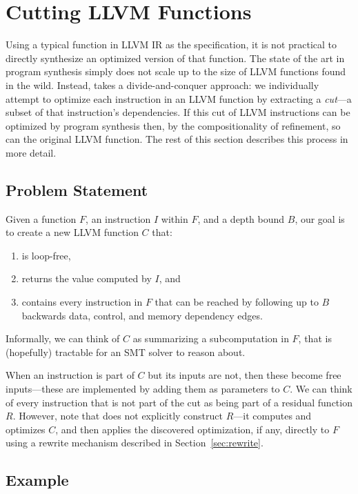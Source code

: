 \section{Cutting LLVM Functions}
\label{sec:cut}

Using a typical function in LLVM IR as the specification, it is not
practical to directly synthesize an optimized version of that
function.
%
The state of the art in program synthesis simply does not scale up to
the size of LLVM functions found in the wild.
%
Instead, \minotaur{} takes a divide-and-conquer approach: we individually
attempt to optimize each instruction in an LLVM function by extracting
a \textit{cut}---a subset of that instruction's dependencies.
%
If this cut of LLVM instructions can be optimized by program synthesis
then, by the compositionality of refinement, so can the original LLVM
function.
%
The rest of this section describes this process in more detail.


\subsection{Problem Statement}

Given a function $F$, an instruction $I$ within $F$, and a depth
bound $B$, our goal is to create a new LLVM function $C$ that:
%
\begin{enumerate}
\item
  is loop-free,
\item
  returns the value computed by $I$, and
\item
  contains every instruction in $F$ that can be reached by following
  up to $B$ backwards data, control, and memory dependency edges.
\end{enumerate}
%
Informally, we can think of $C$ as summarizing a subcomputation in
$F$, that is (hopefully) tractable for an SMT solver to reason about.


When an instruction is part of $C$ but its inputs are not, then these
become free inputs---these are implemented by adding them as
parameters to $C$.
%
We can think of every instruction that is not part of the cut as being
part of a residual function $R$.
%
However, note that \minotaur{} does not explicitly construct $R$---it
computes and optimizes $C$, and then applies the discovered
optimization, if any, directly to $F$ using a rewrite mechanism
described in Section~\ref{sec:rewrite}.


\subsection{Example}


